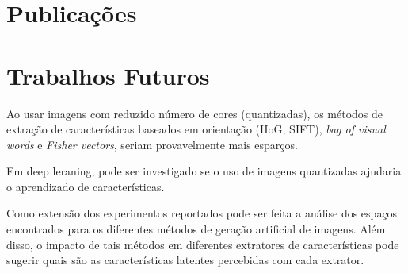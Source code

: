 




\section{Publicações}

\section{Trabalhos Futuros}

Ao usar imagens com reduzido número de cores (quantizadas), os métodos de extração de características baseados em orientação (HoG, SIFT), \textit{bag of visual words} e \textit{Fisher vectors}, seriam provavelmente mais esparços.

Em deep leraning, pode ser investigado se o uso de imagens quantizadas ajudaria o aprendizado de características.

Como extensão dos experimentos reportados pode ser feita a análise dos espaços encontrados para os diferentes métodos de geração artificial de imagens. Além disso, o impacto de tais métodos em diferentes extratores de características pode sugerir quais são as características latentes percebidas com cada extrator.

%
%
%


